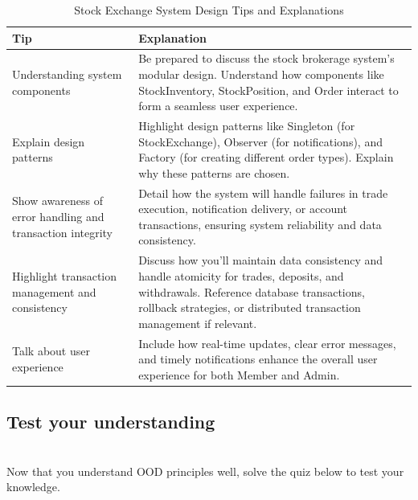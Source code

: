 \begin{table}[h!]
\centering
\begin{tabularx}{\textwidth}{|X|X|}
\hline
\textbf{Tip} & \textbf{Explanation} \\
\hline
Understanding system components & Be prepared to discuss the stock brokerage system’s modular design. Understand how components like StockInventory, StockPosition, and Order interact to form a seamless user experience. \\
\hline
Explain design patterns & Highlight design patterns like Singleton (for StockExchange), Observer (for notifications), and Factory (for creating different order types). Explain why these patterns are chosen. \\
\hline
Show awareness of error handling and transaction integrity & Detail how the system will handle failures in trade execution, notification delivery, or account transactions, ensuring system reliability and data consistency. \\
\hline
Highlight transaction management and consistency & Discuss how you’ll maintain data consistency and handle atomicity for trades, deposits, and withdrawals. Reference database transactions, rollback strategies, or distributed transaction management if relevant. \\
\hline
Talk about user experience & Include how real-time updates, clear error messages, and timely notifications enhance the overall user experience for both Member and Admin. \\
\hline
\end{tabularx}
\caption{Stock Exchange System Design Tips and Explanations}
\label{tab:stock_exchange_tips}
\end{table}

\subsection{Test your understanding}\label{sqlOKnwkgxaR9v-G2p3VH}
\\
Now that you understand OOD principles well, solve the quiz below to test your knowledge.

